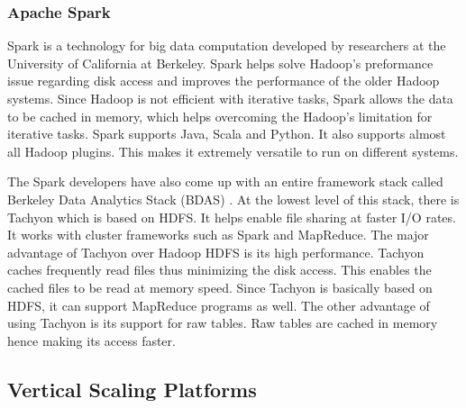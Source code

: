 \documentclass[journal]{IEEEtran}
\begin{document}
\subsubsection{\textbf{Apache Spark}}
Spark is a technology for big data computation developed by researchers at the University of California at Berkeley. Spark helps solve Hadoop's preformance issue regarding disk access and improves the performance of the older Hadoop systems. Since Hadoop is not efficient with iterative tasks, Spark allows the data to be cached in memory, which helps overcoming the Hadoop’s limitation for iterative tasks. Spark supports Java, Scala and Python. It also supports almost all Hadoop plugins. This makes it extremely versatile to run on different systems. \cite{Singh2014}

The Spark developers have also come up with an entire framework stack called Berkeley Data Analytics Stack (BDAS) \cite{bdas}. At the lowest level of this stack, there is Tachyon which is based on HDFS. It helps enable file sharing at faster I/O rates. It works with cluster frameworks such as Spark and MapReduce. The major advantage of Tachyon over Hadoop HDFS is its high performance. Tachyon caches frequently read files thus minimizing the disk access. This enables the cached files to be read at memory speed. Since Tachyon is basically based on HDFS, it can support MapReduce programs as well. The other advantage of using Tachyon is its support for raw tables. Raw tables are cached in memory hence making its access faster.

\subsection{Vertical Scaling Platforms}
\end{document}
